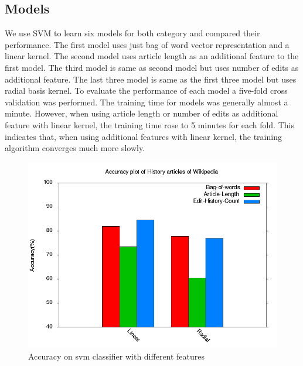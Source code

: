\documentclass[twocolumn]{article}
\newcommand{\comment}[1]{}
\begin{document}
  \subsection{Models}
  	We use SVM to learn six models for both category and compared their
performance. The first model uses just bag of word vector representation
and a linear kernel. The second model uses article length as an additional 
feature to the first model. The third model is same as second model but uses
number of edits as additional feature. The last three model is same as the
first three model but uses radial basis kernel. To evaluate the performance of
each model a five-fold cross validation was performed. The training time for
models was generally almost a minute. However, when using article length or 
number of edits as additional feature with linear kernel, the training time
rose to 5 minutes for each fold. This indicates that, when using additional
features with linear kernel, the training algorithm converges much more slowly.
 \comment{

 Use the following format for figures:

 \begin{figure}[t]
         \centering
         \texttt{[image: figure\_file]}
         \caption{This figure explains this.}
         \label{fig:block}
 \end{figure}

 And refer as Figure \ref{fig:block}.

 }
\begin{figure}[t]
         \centering
         \includegraphics[width=0.95\columnwidth]{accuracy_plot.png}
         \caption{Accuracy on svm classifier with different features}
         \label{fig:1}
 \end{figure}
\end{document}
